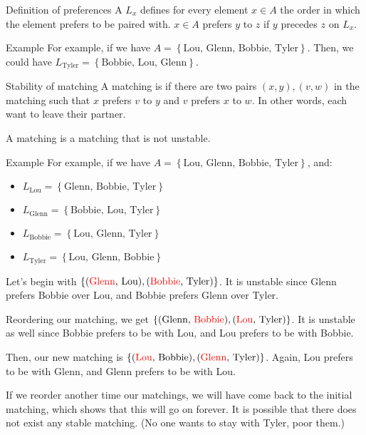 \documentclass[a4paper]{article}
\begin{document}
\begin{parag}{Definition of preferences}
    A  $L_x$ defines for every element $x \in A$ the order in which the element prefers to be paired with. $x \in A$ prefers $y$ to $z$ if $y$ precedes $z$ on $L_x$.

    \begin{subparag}{Example}
        For example, if we have $A = \left\{\text{Lou, Glenn, Bobbie, Tyler}\right\}$. Then, we could have $L_{\text{Tyler}} = \left\{\text{Bobbie, Lou, Glenn}\right\}$.
    \end{subparag}

\end{parag}

\begin{parag}{Stability of matching}
    A matching is  if there are two pairs $\left(x, y\right),\left(v, w\right)$ in the matching such that $x$ prefers $v$ to $y$ and $v$ prefers $x$ to $w$. In other words, each want to leave their partner.

    A  matching is a matching that is not unstable.

    \begin{subparag}{Example}
        For example, if we have $A = \left\{\text{Lou, Glenn, Bobbie, Tyler}\right\}$, and:
        \begin{itemize}
            \item $L_{\text{Lou}} = \left\{\text{Glenn, Bobbie, Tyler}\right\}$
            \item $L_{\text{Glenn}} = \left\{\text{Bobbie, Lou, Tyler}\right\}$
            \item $L_{\text{Bobbie}} = \left\{\text{Lou, Glenn, Tyler}\right\}$
            \item $L_{\text{Tyler}} = \left\{\text{Lou, Glenn, Bobbie}\right\}$
        \end{itemize}

        Let's begin with $\left\{\left(\text{\textcolor{red}{Glenn}, Lou}\right), \left(\text{\textcolor{red}{Bobbie}, Tyler}\right)\right\}$. It is unstable since Glenn prefers Bobbie over Lou, and Bobbie prefers Glenn over Tyler.

        Reordering our matching, we get $\left\{\left(\text{Glenn, \textcolor{red}{Bobbie}}\right), \left(\text{\textcolor{red}{Lou}, Tyler}\right)\right\}$. It is unstable as well since Bobbie prefers to be with Lou, and Lou prefers to be with Bobbie.

        Then, our new matching is $\left\{\left(\text{\textcolor{red}{Lou}, Bobbie}\right), \left(\text{\textcolor{red}{Glenn}, Tyler}\right)\right\}$. Again, Lou prefers to be with Glenn, and Glenn prefers to be with Lou.

        If we reorder another time our matchings, we will have come back to the initial matching, which shows that this will go on forever. It is possible that there does not exist any stable matching. (No one wants to stay with Tyler, poor them.)
    \end{subparag}
\end{parag}
\end{document}
